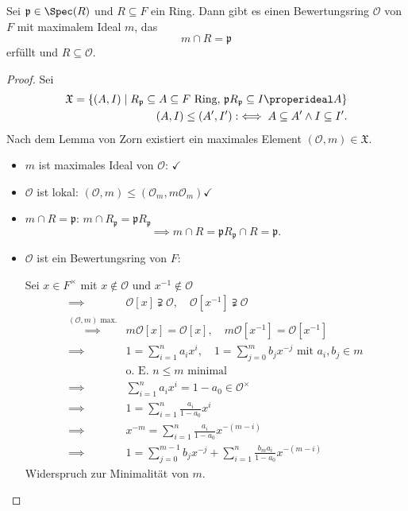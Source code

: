 \begin{theorem}[Cheralley]
    Sei $\mathfrak{p} \in \Spec(R)$ und $R \subseteq F$ ein Ring. Dann gibt es einen Bewertungsring $\mathcal{O}$ von $F$ mit 
    maximalem Ideal $m$, das $$m \cap R = \mathfrak{p}$$ erfüllt und $R \subseteq \mathcal{O}$.
\end{theorem}
\begin{proof}
    Sei 
    \begin{align*}
        \mathfrak{X}=\{(A,I) \mid R_\mathfrak{p} \subseteq A \subseteq F \text{ Ring, } \mathfrak{p}R_\mathfrak{p} \subseteq I \properideal A\}\\
        (A,I) \leq (A',I') : \iff A \subseteq A' \land I \subseteq I'.
    \end{align*}
    Nach dem Lemma von Zorn existiert ein maximales Element $(\mathcal{O}, m) \in \mathfrak{X}$.
    \begin{itemize}
        \item $m$ ist maximales Ideal von $\mathcal{O}$: $\checkmark$
        \item $\mathcal{O}$ ist lokal: $(\mathcal{O}, m) \leq (\mathcal{O}_m,m\mathcal{O}_m) \checkmark$
        \item $m \cap R = \mathfrak{p}$: $m \cap R_\mathfrak{p} = \mathfrak{p}R_\mathfrak{p}$
        $$ \implies m \cap R = \mathfrak{p}R_\mathfrak{p} \cap R = \mathfrak{p}.$$
        \item $\mathcal{O}$ ist ein Bewertungsring von $F$:
        
        Sei $x \in F^\times$ mit $x \notin \mathcal{O}$ und $x^{-1} \notin \mathcal{O}$
        \begin{align*}
            \implies & \mathcal{O}[x] \supsetneqq \mathcal{O},\quad \mathcal{O}[x^{-1}] \supsetneqq \mathcal{O}\\
            \stackrel{(\mathcal{O},m) \text{ max.}}{\implies}& m\mathcal{O}[x] = \mathcal{O}[x], \quad m\mathcal{O}[x^{-1}]= \mathcal{O}[x^{-1}]\\
            \implies & 1 = \sum\limits_{i=1}^n a_ix^i, \quad 1 = \sum\limits_{j=0}^m b_jx^{-j} \text{ mit } a_i,b_j \in m\\
            &\text{o. E. } n\leq m \text{ minimal}\\
            \implies & \sum\limits_{i=1}^n a_ix^i = 1 - a_0 \in \mathcal{O}^\times \\
            \implies & 1 = \sum\limits_{i=1}^n \frac{a_i}{1 - a_0} x^i\\
            \implies & x^{-m} = \sum\limits_{i=1}^n \frac{a_i}{1-a_0} x ^{-(m-i)}\\
            \implies & 1 = \sum\limits_{j=0}^{m-1} b_j x^{-j} + \sum\limits_{i=1}^n \frac{b_ma_i}{1-a_0}x^{-(m-i)}
        \end{align*}
        Widerspruch zur Minimalität von $m$.
    \end{itemize}
\end{proof}

